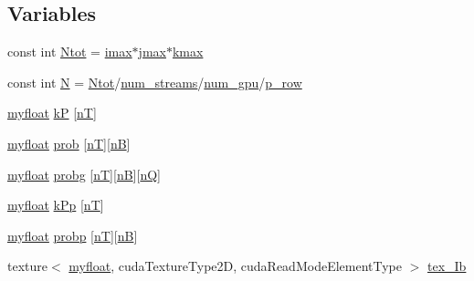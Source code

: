 \subsection*{Variables}
\begin{DoxyCompactItemize}
\item 
const int \hyperlink{mc__gpu_8cu_aa6db95efdd74f7ed82aec0509a3c6079}{Ntot} = \hyperlink{param_8h_a788916a7426baf172c67386359720d6d}{imax}$\ast$\hyperlink{param_8h_ac5c80d846ec0c4cf1c91fc5d9d66faa1}{jmax}$\ast$\hyperlink{param_8h_ae0453dd20a7c6a923904df942ef82468}{kmax}
\item 
const int \hyperlink{mc__gpu_8cu_ab2b6b0c222cd1ce70d6a831f57241e59}{N} = \hyperlink{mc__gpu_8cu_aa6db95efdd74f7ed82aec0509a3c6079}{Ntot}/\hyperlink{param_8h_ad38ac11e843c3ad8714da6e5599cd1fb}{num\+\_\+streams}/\hyperlink{param_8h_a31fefa6ddf1551a61e2cf79a379ff797}{num\+\_\+gpu}/\hyperlink{param_8h_a149afb59990224def797b29467985bac}{p\+\_\+row}
\item 
\hyperlink{param_8h_a5f097c9f3873af7be7fc156e6a06ca5e}{myfloat} \hyperlink{mc__gpu_8cu_ace3a0d571ca64447b29bc9999d23b85e}{kP} \mbox{[}\hyperlink{NarrowBand_8h_a11e43991170d325cb21737c8e7d5acaa}{nT}\mbox{]}
\item 
\hyperlink{param_8h_a5f097c9f3873af7be7fc156e6a06ca5e}{myfloat} \hyperlink{mc__gpu_8cu_a19c66f36e67229ffc84148aa337bc329}{prob} \mbox{[}\hyperlink{NarrowBand_8h_a11e43991170d325cb21737c8e7d5acaa}{nT}\mbox{]}\mbox{[}\hyperlink{NarrowBand_8h_aca13f491975ccaa9a165708a85753bda}{nB}\mbox{]}
\item 
\hyperlink{param_8h_a5f097c9f3873af7be7fc156e6a06ca5e}{myfloat} \hyperlink{mc__gpu_8cu_a154b4ee2e5ccbfa05ff4d8df0337f5a3}{probg} \mbox{[}\hyperlink{NarrowBand_8h_a11e43991170d325cb21737c8e7d5acaa}{nT}\mbox{]}\mbox{[}\hyperlink{NarrowBand_8h_aca13f491975ccaa9a165708a85753bda}{nB}\mbox{]}\mbox{[}\hyperlink{NarrowBand_8h_ac207cb86a4c7e5bc1973837ee2339e59}{nQ}\mbox{]}
\item 
\hyperlink{param_8h_a5f097c9f3873af7be7fc156e6a06ca5e}{myfloat} \hyperlink{mc__gpu_8cu_a0eb715a1a15f62d859469e88a101e666}{k\+Pp} \mbox{[}\hyperlink{NarrowBand_8h_a11e43991170d325cb21737c8e7d5acaa}{nT}\mbox{]}
\item 
\hyperlink{param_8h_a5f097c9f3873af7be7fc156e6a06ca5e}{myfloat} \hyperlink{mc__gpu_8cu_a83c1d7ca537eb5fb4a345d9fb2efa881}{probp} \mbox{[}\hyperlink{NarrowBand_8h_a11e43991170d325cb21737c8e7d5acaa}{nT}\mbox{]}\mbox{[}\hyperlink{NarrowBand_8h_aca13f491975ccaa9a165708a85753bda}{nB}\mbox{]}
\item 
texture$<$ \hyperlink{param_8h_a5f097c9f3873af7be7fc156e6a06ca5e}{myfloat}, cuda\+Texture\+Type2D, cuda\+Read\+Mode\+Element\+Type $>$ \hyperlink{mc__gpu_8cu_a9845843f86869d1ea8e08ed0458cd0f0}{tex\+\_\+\+Ib}

\end{DoxyCompactItemize}
